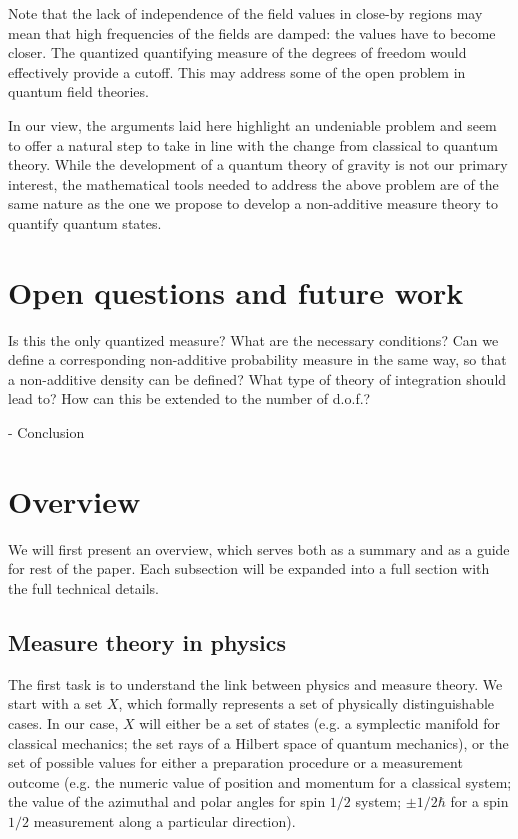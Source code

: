 \documentclass[10pt,twocolumn, nofootinbib]{revtex4-2}
\begin{document}
Note that the lack of independence of the field values in close-by regions may mean that high frequencies of the fields are damped: the values have to become closer. The quantized quantifying measure of the degrees of freedom would effectively provide a cutoff. This may address some of the open problem in quantum field theories.

In our view, the arguments laid here highlight an undeniable problem and seem to offer a natural step to take in line with the change from classical to quantum theory. While the development of a quantum theory of gravity is not our primary interest, the mathematical tools needed to address the above problem are of the same nature as the one we propose to develop a non-additive measure theory to quantify quantum states.

\section{Open questions and future work}



Is this the only quantized measure? What are the necessary conditions? Can we define a corresponding non-additive probability measure in the same way, so that a non-additive density can be defined? What type of theory of integration should lead to? How can this be extended to the number of d.o.f.?

- Conclusion



\section{Overview}

We will first present an overview, which serves both as a summary and as a guide for rest of the paper. Each subsection will be expanded into a full section with the full technical details.

\subsection{Measure theory in physics}

The first task is to understand the link between physics and measure theory. We start with a set $X$, which formally represents a set of physically distinguishable cases. In our case, $X$ will either be a set of states (e.g. a symplectic manifold for classical mechanics; the set rays of a Hilbert space of quantum mechanics), or the set of possible values for either a preparation procedure or a measurement outcome (e.g. the numeric value of position and momentum for a classical system; the value of the azimuthal and polar angles for spin $1/2$ system; $\pm 1/2 \hbar$ for a spin $1/2$ measurement along a particular direction).
\end{document}
